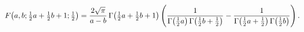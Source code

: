 \[\mathop{F\/}\nolimits\!\left(a,b;\tfrac{1}{2}a+\tfrac{1}{2}b+1;\tfrac{1}{2}%
\right)=\frac{2\sqrt{\pi}}{a-b}\mathop{\Gamma\/}\nolimits\!\left(\tfrac{1}{2}a%
+\tfrac{1}{2}b+1\right)\*\left(\frac{1}{\mathop{\Gamma\/}\nolimits\!\left(%
\tfrac{1}{2}a\right)\mathop{\Gamma\/}\nolimits\!\left(\tfrac{1}{2}b+\tfrac{1}{%
2}\right)}-\frac{1}{\mathop{\Gamma\/}\nolimits\!\left(\tfrac{1}{2}a+\tfrac{1}{%
2}\right)\mathop{\Gamma\/}\nolimits\!\left(\tfrac{1}{2}b\right)}\right).\]